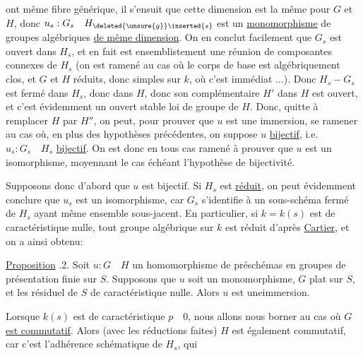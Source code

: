 ont même fibre générique, il s'ensuit que cette dimension est la même pour $G$ et $H$, donc $u_s:G_s\quad H_{\deleted{\unsure{g}}\inserted{s}}$ est un \uline{monomorphisme} de groupes algébriques \uline{de même dimension}. On en conclut facilement que $G_s$ est ouvert dans $H_s$, et en fait est ensemblistement une  réunion de composantes connexes de $H_s$ (on est ramené au cas où le corps de base est algébriquement clos, et $G$ et $H$ réduits, donc simples sur $k$, où c'est immédiat ...). Donc $H_s-G_s$ est fermé dans $H_s$, donc dans $H$, donc son complémentaire $H'$ dans $H$ est ouvert, et c'est évidemment un ouvert stable  loi de groupe de $H$. Donc,   quitte à remplacer $H$ par $H''$, on peut, pour prouver que $u$ est une immersion, se ramener au cas où, en plus des hypothèses précédentes, on suppose $u$ \uline{bijectif},  i.e. $u_s:G_s\quad H_s$ \uline{bijectif}. On est donc en tous cas ramené à prouver que $u$  est un isomorphisme, moyennant le cas échéant l'hypothèse de bijectivité.

Supposons donc d'abord que $u$ est bijectif. Si $H_s$ est \uline{réduit}, on peut évidemment conclure que $u_s$ est un isomorphisme, car $G_s$ s'identifie à un sous-schéma fermé de $H_s$ ayant même ensemble sous-jacent. En particulier, si $k=k(s)$ est de caractéristique nulle, tout groupe algébrique sur $k$ est réduit d'après \uline{Cartier}, et on  a ainsi obtenu:

\uline{Proposition} .2. Soit $u:G\quad H$ un homomorphisme de préschémas en groupes de présentation finie sur $S$. Supposons que $u$ soit un monomorphisme, $G$ plat sur $S$, et les  résiduel de $S$  de caractéristique nulle. Alors $u$ est uneimmersion.

Lorsque $k(s)$ est de caractéristique $p\quad0$, nous allons nous borner au cas où $G$ \uline{est commutatif}. Alors (avec les réductions faites) $H$ est également commutatif, car c'est l'adhérence schématique de $H_s$, qui
